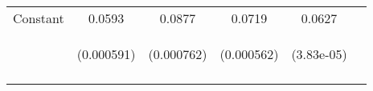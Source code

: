 \documentclass[12pt,oneside]{amsbook}
\begin{document}
\begin{table}
\begin{tabular}{lccccc}
Constant                          & 0.0593 &0.0877 &0.0719 &0.0627\\
& \begin{footnotesize}(0.000591)\end{footnotesize} & 
\begin{footnotesize}(0.000762)\end{footnotesize} & \begin{footnotesize}(0.000562)\end{footnotesize} & \begin{footnotesize}(3.83e-05)\end{footnotesize}  \\

 &  &  &  &  &  \\
 \hline
\end{tabular}

\end{table}
\end{document}

